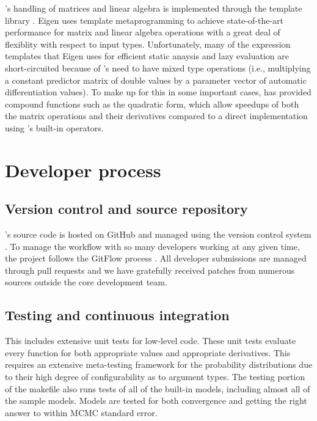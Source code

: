 \documentclass[article]{jss}
\begin{document}
's handling of matrices and linear algebra is
implemented through the   template library
\citep{Eigen:2012}.  Eigen uses template metaprogramming to achieve
state-of-the-art performance for matrix and linear algebra operations
with a great deal of flexiblity with respect to input types.
Unfortunately, many of the expression templates that Eigen uses for
efficient static anaysis and lazy evaluation are short-circuited
because of 's need to have mixed type operations (i.e.,
multiplying a constant predictor matrix of double values by a
parameter vector of automatic differentiation values).  To make up for
this in some important cases,  has provided compound
functions such as the quadratic form, which allow speedups of both the
matrix operations and their derivatives compared to a direct
implementation using 's built-in operators.


\section{Developer process}

\subsection{Version control and source repository}

's source code is hosted on GitHub and managed using
the  version control system \citep{Chacon:2009}.  To manage
the workflow with so many developers working at any given time, the
project follows the GitFlow process \citep{Driessen:2010}.  All
developer submissions are managed through pull requests and we have
gratefully received patches from numerous sources outside the core
development team.


\subsection{Testing and continuous integration}

This includes extensive unit tests for low-level  code.
These unit tests evaluate every function for both appropriate values
and appropriate derivatives.  This requires an extensive meta-testing
framework for the probability distributions due to their high degree
of configurability as to argument types.  The testing portion of the
makefile also runs tests of all of the built-in models, including
almost all of the  sample models.  Models are tested
for both convergence and getting the right answer to within MCMC
standard error.  
\end{document}
